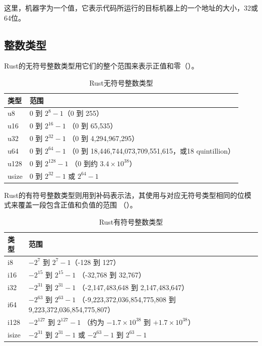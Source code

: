 \smallskip
这里，机器字为一个值，它表示代码所运行的目标机器上的一个地址的大小，32或64位。

\medskip
\subsection{整数类型}
Rust的无符号整数类型用它们的整个范围来表示正值和零（）。

\smallskip
\begin{table}[h]
    \small
    \caption{Rust无符号整数类型}\label{TABLE3-3}
    \begin{tabularx}{\linewidth}{X X}
        \toprule
        \textbf{类型} & \textbf{范围} \\
        \midrule
        u8 & 0 到 $2^8-1$（0 到 255）\\
        u16 & 0 到 $2^{16}-1$ （0 到 65,535） \\
        u32 & 0 到 $2^{32}-1$ （0 到 4,294,967,295） \\
        u64 & 0 到 $2^{64}-1$ （0 到 18,446,744,073,709,551,615，或18 quintillion） \\
        u128 & 0 到 $2^{128}-1$ （0 到约 $3.4 \times 10^{38}$） \\
        usize & 0 到 $2^{32}-1$ 或 $2^{64}-1$ \\
        \bottomrule
    \end{tabularx}
\end{table}

Rust的有符号整数类型则用到补码表示法，其使用与对应无符号类型相同的位模式来覆盖一段包含正值和负值的范围
（）。

\smallskip
\begin{table}[h]
    \small
    \caption{Rust有符号整数类型}\label{TABLE3-4}
    \begin{tabularx}{\linewidth}{X X}
        \toprule
        \textbf{类型} & \textbf{范围} \\
        \midrule
        i8 & $-2^7$ 到 $2^7-1$（-128 到 127）\\
        i16 & $-2^{15}$ 到 $2^{15}-1$ （-32,768 到 32,767） \\
        i32 & $-2^{31}$ 到 $2^{31}-1$ （-2,147,483,648 到 2,147,483,647） \\
        i64 & $-2^{63}$ 到 $2^{63}-1$ （-9,223,372,036,854,775,808 到 9,223,372,036,854,775,807） \\
        i128 & $-2^{127}$ 到 $2^{127}-1$ （约为 $-1.7 \times 10^{38}$ 到 $+1.7 \times 10^{38}$） \\
        isize & $-2^{31}$ 到 $2^{31}-1$ 或 $-2^{63}-1$ 到 $2^{63}-1$\\
        \bottomrule
    \end{tabularx}
\end{table}

